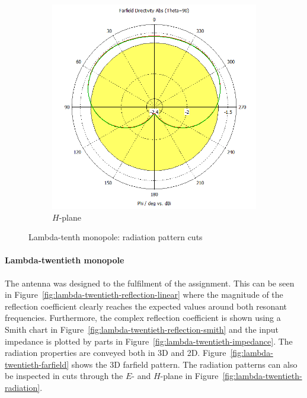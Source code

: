 \documentclass[11pt,a4paper]{article}
\begin{document}
\begin{figure}[!ht]
\begin{subfigure}{.4\textwidth}
                \includegraphics[width=\textwidth]{src/lambda-tenth-radiation-h.png}
                \caption{\label{fig:lambda-tenth-sim-radiation-h}$H$-plane}
            \end{subfigure}
            \caption{\label{fig:lambda-tenth-radiation}Lambda-tenth monopole: radiation pattern cuts}
        \end{figure}

\newpage
        \paragraph{Lambda-twentieth monopole} The antenna was designed to the fulfilment of the assignment. This can be seen in Figure~\ref{fig:lambda-twentieth-reflection-linear} where the magnitude of the reflection coefficient clearly reaches the expected values around both resonant frequencies. Furthermore, the complex reflection coefficient is shown using a Smith chart in Figure~\ref{fig:lambda-twentieth-reflection-smith} and the input impedance is plotted by parts in Figure~\ref{fig:lambda-twentieth-impedance}. The radiation properties are conveyed both in 3D and 2D. Figure~\ref{fig:lambda-twentieth-farfield} shows the 3D farfield pattern. The radiation patterns can also be inspected in cuts through the $E$- and $H$-plane in Figure~\ref{fig:lambda-twentieth-radiation}.
        
\end{document}
